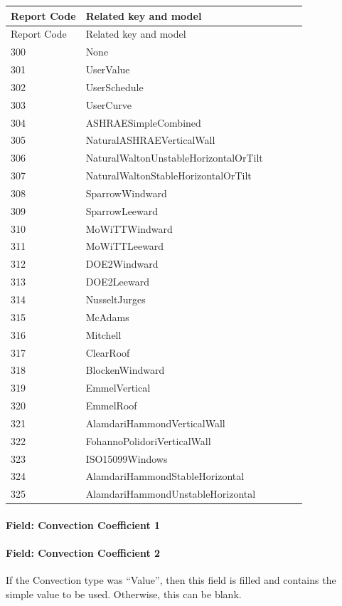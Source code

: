 \begin{longtable}[c]{@{}ll@{}}
\toprule 
Report Code & Related key and model \tabularnewline
\midrule
\endfirsthead

\toprule 
Report Code & Related key and model \tabularnewline
\midrule
\endhead

300 & None~ \tabularnewline
301 & UserValue \tabularnewline
302 & UserSchedule \tabularnewline
303 & UserCurve~~~~~~~~~~~~~~~~~~~~~~~~~~~~~~ \tabularnewline
304 & ASHRAESimpleCombined~~~~~~~~~~~~~~~~~~~ \tabularnewline
305 & NaturalASHRAEVerticalWall~~~~~~~~~~~~~~ \tabularnewline
306 & NaturalWaltonUnstableHorizontalOrTilt~~ \tabularnewline
307 & NaturalWaltonStableHorizontalOrTilt~~~~ \tabularnewline
308 & SparrowWindward~~~~~~~~~~~~~~~~~~~~~~~~ \tabularnewline
309 & SparrowLeeward~~~~~~~~~~~~~~~~~~~~~~~~~ \tabularnewline
310 & MoWiTTWindward~~~~~~~~~~~~~~~~~~~~~~~~~ \tabularnewline
311 & MoWiTTLeeward~~~~~~~~~~~~~~~~~~~~~~~~~~ \tabularnewline
312 & DOE2Windward~~~~~~~~~~~~~~~~~~~~~~~~~~~ \tabularnewline
313 & DOE2Leeward~~~~~~~~~~~~~~~~~~~~~~~~~~~~ \tabularnewline
314 & NusseltJurges~~~~~~~~~~~~~~~~~~~~~~~~~~ \tabularnewline
315 & McAdams~~~~~~~~~~~~~~~~~~~~~~~~~~~~~~~~ \tabularnewline
316 & Mitchell~~~~~~~~~~~~~~~~~~~~~~~~~~~~~~~ \tabularnewline
317 & ClearRoof~~~~~~~~~~~~~~~~~~~~~~~~~~~~~~ \tabularnewline
318 & BlockenWindward~~~~~~~~~~~~~~~~~~~~~~~~ \tabularnewline
319 & EmmelVertical~~~~~~~~~~~~ ~~~~~~~~~~~~~~ \tabularnewline
320 & EmmelRoof~~~~~~~~~~~~~~~~~~~~~~~~~~~~~~ \tabularnewline
321 & AlamdariHammondVerticalWall~~~~~~~~~~~~ \tabularnewline
322 & FohannoPolidoriVerticalWall~~~~~~~~~~~~ \tabularnewline
323 & ISO15099Windows~~~~~~~~~~~~~~~~~~~~~~~~ \tabularnewline
324 & AlamdariHammondStableHorizontal~~~~~~~~ \tabularnewline
325 & AlamdariHammondUnstableHorizontal~~~~~~ \tabularnewline
\bottomrule
\end{longtable}

\paragraph{Field: Convection Coefficient 1}\label{field-convection-coefficient-1}

\paragraph{Field: Convection Coefficient 2}\label{field-convection-coefficient-2}

If the Convection type was ``Value'', then this field is filled and contains the simple value to be used. Otherwise, this can be blank.

